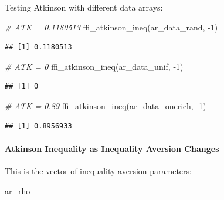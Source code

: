 \documentclass[
]{book}
\newenvironment{Shaded}{\begin{snugshade}}{\end{snugshade}}
\newcommand{\CommentTok}[1]{\textcolor[rgb]{0.56,0.35,0.01}{\textit{#1}}}
\newcommand{\DecValTok}[1]{\textcolor[rgb]{0.00,0.00,0.81}{#1}}
\newcommand{\FunctionTok}[1]{\textcolor[rgb]{0.00,0.00,0.00}{#1}}
\newcommand{\NormalTok}[1]{#1}
\newcommand{\SpecialCharTok}[1]{\textcolor[rgb]{0.00,0.00,0.00}{#1}}
\begin{document}
Testing Atkinson with different data arrays:

\begin{Shaded}
\begin{Highlighting}[]
\CommentTok{\# ATK = 0.1180513}
\FunctionTok{ffi\_atkinson\_ineq}\NormalTok{(ar\_data\_rand, }\SpecialCharTok{{-}}\DecValTok{1}\NormalTok{)}
\end{Highlighting}
\end{Shaded}

\begin{verbatim}
## [1] 0.1180513
\end{verbatim}

\begin{Shaded}
\begin{Highlighting}[]
\CommentTok{\# ATK = 0}
\FunctionTok{ffi\_atkinson\_ineq}\NormalTok{(ar\_data\_unif, }\SpecialCharTok{{-}}\DecValTok{1}\NormalTok{)}
\end{Highlighting}
\end{Shaded}

\begin{verbatim}
## [1] 0
\end{verbatim}

\begin{Shaded}
\begin{Highlighting}[]
\CommentTok{\# ATK = 0.89}
\FunctionTok{ffi\_atkinson\_ineq}\NormalTok{(ar\_data\_onerich, }\SpecialCharTok{{-}}\DecValTok{1}\NormalTok{)}
\end{Highlighting}
\end{Shaded}

\begin{verbatim}
## [1] 0.8956933
\end{verbatim}

\hypertarget{atkinson-inequality-as-inequality-aversion-changes}{%
\paragraph{Atkinson Inequality as Inequality Aversion Changes}\label{atkinson-inequality-as-inequality-aversion-changes}}

This is the vector of inequality aversion parameters:

\begin{Shaded}
\begin{Highlighting}[]
\NormalTok{ar\_rho}
\end{Highlighting}
\end{Shaded}
\end{document}

